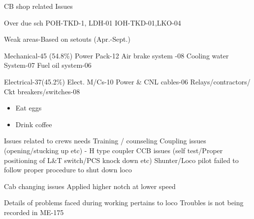 \documentclass[
  ignorenonframetext,
]{beamer}
\providecommand{\tightlist}{%
  \setlength{\itemsep}{0pt}\setlength{\parskip}{0pt}}
\begin{document}
\begin{frame}{CB shop related Issues}
\protect\hypertarget{cb-shop-related-issues}{}
\begin{block}{Over due sch}
\protect\hypertarget{over-due-sch}{}
POH-TKD-1, LDH-01 IOH-TKD-01,LKO-04
\end{block}

\begin{block}{Weak areas-Based on setouts (Apr.-Sept.)}
\protect\hypertarget{weak-areas-based-on-setouts-apr.-sept.}{}

\begin{block}{Mechanical-45 (54.8\%)}
\protect\hypertarget{mechanical-45-54.8}{}
Power Pack-12 Air brake system -08 Cooling water System-07 Fuel oil
system-06
\end{block}

\begin{block}{Electrical-37(45.2\%)}
\protect\hypertarget{electrical-3745.2}{}
Elect. M/Cs-10 Power \& CNL cables-06 Relays/contractors/ Ckt
breakers/switches-08

\begin{itemize}
\tightlist
\item
  Eat eggs
\item
  Drink coffee
\end{itemize}

\end{block}

\begin{block}{Issues related to crews needs Training / counseling}
\protect\hypertarget{issues-related-to-crews-needs-training-counseling}{}
Coupling issues (opening/stucking up etc) - H type coupler CCB issues
(self test/Proper positioning of L\&T switch/PCS knock down etc)
Shunter/Loco pilot failed to follow proper procedure to shut down loco

Cab changing issues Applied higher notch at lower speed

Details of problems faced during working pertains to loco Troubles is
not being recorded in ME-175
\end{block}
\end{block}
\end{frame}
\end{document}

